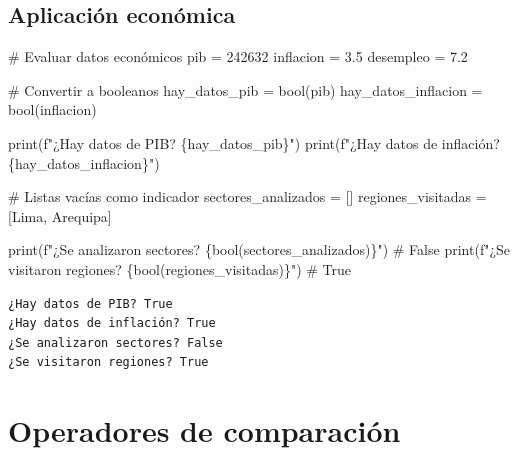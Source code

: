 \documentclass[
  doc,
  floatsintext,
  longtable,
  a4paper,
  nolmodern,
  notxfonts,
  notimes,
  12pt,
  colorlinks=true,linkcolor=blue,citecolor=blue,urlcolor=blue]{apa7}
\newenvironment{Shaded}{\begin{snugshade}}{\end{snugshade}}
\newcommand{\BuiltInTok}[1]{\textcolor[rgb]{0.00,0.23,0.31}{#1}}
\newcommand{\CommentTok}[1]{\textcolor[rgb]{0.37,0.37,0.37}{#1}}
\newcommand{\DecValTok}[1]{\textcolor[rgb]{0.68,0.00,0.00}{#1}}
\newcommand{\FloatTok}[1]{\textcolor[rgb]{0.68,0.00,0.00}{#1}}
\newcommand{\NormalTok}[1]{\textcolor[rgb]{0.00,0.23,0.31}{#1}}
\newcommand{\OperatorTok}[1]{\textcolor[rgb]{0.37,0.37,0.37}{#1}}
\newcommand{\SpecialCharTok}[1]{\textcolor[rgb]{0.37,0.37,0.37}{#1}}
\newcommand{\SpecialStringTok}[1]{\textcolor[rgb]{0.13,0.47,0.30}{#1}}
\newcommand{\StringTok}[1]{\textcolor[rgb]{0.13,0.47,0.30}{#1}}
\begin{document}
\subsection{Aplicación económica}\label{aplicaciuxf3n-econuxf3mica}

\begin{Shaded}
\begin{Highlighting}[]
\CommentTok{\# Evaluar datos económicos}
\NormalTok{pib }\OperatorTok{=} \DecValTok{242632}
\NormalTok{inflacion }\OperatorTok{=} \FloatTok{3.5}
\NormalTok{desempleo }\OperatorTok{=} \FloatTok{7.2}

\CommentTok{\# Convertir a booleanos}
\NormalTok{hay\_datos\_pib }\OperatorTok{=} \BuiltInTok{bool}\NormalTok{(pib)}
\NormalTok{hay\_datos\_inflacion }\OperatorTok{=} \BuiltInTok{bool}\NormalTok{(inflacion)}

\BuiltInTok{print}\NormalTok{(}\SpecialStringTok{f"¿Hay datos de PIB? }\SpecialCharTok{\{}\NormalTok{hay\_datos\_pib}\SpecialCharTok{\}}\SpecialStringTok{"}\NormalTok{)}
\BuiltInTok{print}\NormalTok{(}\SpecialStringTok{f"¿Hay datos de inflación? }\SpecialCharTok{\{}\NormalTok{hay\_datos\_inflacion}\SpecialCharTok{\}}\SpecialStringTok{"}\NormalTok{)}

\CommentTok{\# Listas vacías como indicador}
\NormalTok{sectores\_analizados }\OperatorTok{=}\NormalTok{ []}
\NormalTok{regiones\_visitadas }\OperatorTok{=}\NormalTok{ [}\StringTok{\textquotesingle{}Lima\textquotesingle{}}\NormalTok{, }\StringTok{\textquotesingle{}Arequipa\textquotesingle{}}\NormalTok{]}

\BuiltInTok{print}\NormalTok{(}\SpecialStringTok{f"¿Se analizaron sectores? }\SpecialCharTok{\{}\BuiltInTok{bool}\NormalTok{(sectores\_analizados)}\SpecialCharTok{\}}\SpecialStringTok{"}\NormalTok{)  }\CommentTok{\# False}
\BuiltInTok{print}\NormalTok{(}\SpecialStringTok{f"¿Se visitaron regiones? }\SpecialCharTok{\{}\BuiltInTok{bool}\NormalTok{(regiones\_visitadas)}\SpecialCharTok{\}}\SpecialStringTok{"}\NormalTok{)    }\CommentTok{\# True}
\end{Highlighting}
\end{Shaded}

\begin{verbatim}
¿Hay datos de PIB? True
¿Hay datos de inflación? True
¿Se analizaron sectores? False
¿Se visitaron regiones? True
\end{verbatim}

\section{Operadores de comparación}\label{operadores-de-comparaciuxf3n}
\end{document}
